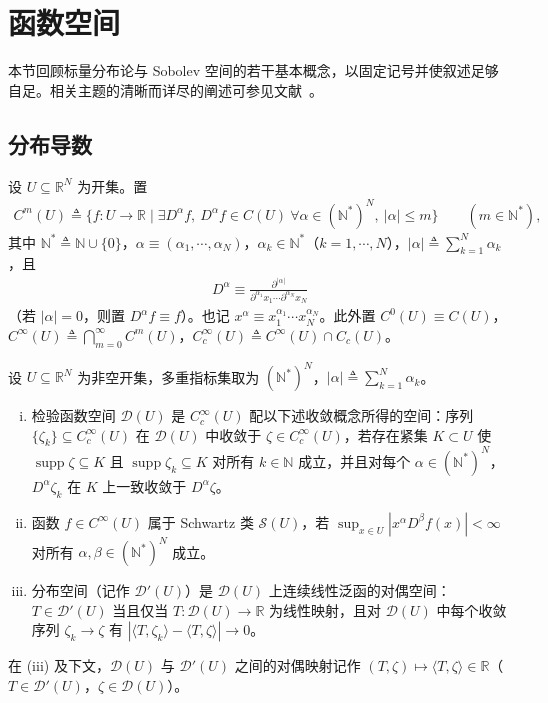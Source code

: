 \documentclass[../../main.tex]{subfiles}%
\begin{document}
\section{函数空间}\label{section:ch03-函数空间}

本节回顾标量分布论与 Sobolev 空间的若干基本概念，以固定记号并使叙述足够自足。相关主题的清晰而详尽的阐述可参见文献~\cite{ref01,ref64}。

\subsection{分布导数}\label{subsection:ch03-分布导数}

设 $U\subseteq\mathbb{R}^N$ 为开集。置
\begin{align*}
C^m(U)\triangleq \{f:U\to\mathbb{R}\mid \exists D^\alpha f,\ D^\alpha f\in C(U)\ \forall\alpha\in(\mathbb{N}^*)^N,\ |\alpha|\leqslant m\}\qquad(m\in\mathbb{N}^*),
\end{align*}
其中 $\mathbb{N}^*\triangleq\mathbb{N}\cup\{0\}$，$\alpha\equiv(\alpha_1,\cdots ,\alpha_N)$，$\alpha_k\in\mathbb{N}^*$（$k=1,\cdots ,N$），$|\alpha|\triangleq \sum_{k=1}^N\alpha_k$，且
\begin{align*}
D^\alpha\equiv\frac{\partial^{|\alpha|}}{\partial^{\alpha_1}x_1\cdots\partial^{\alpha_N}x_N}
\end{align*}
（若 $|\alpha|=0$，则置 $D^\alpha f\equiv f$）。也记 $x^\alpha\equiv x_1^{\alpha_1}\cdots x_N^{\alpha_N}$。此外置 $C^0(U)\equiv C(U)$，$C^\infty(U)\triangleq \bigcap_{m=0}^\infty C^m(U)$，$C^\infty_c(U)\triangleq C^\infty(U)\cap C_c(U)$。

\begin{definition}\label{definition:ch03-分布与检验函数}
设 $U\subseteq\mathbb{R}^N$ 为非空开集，多重指标集取为 $(\mathbb{N}^*)^N$，$|\alpha|\triangleq\sum_{k=1}^N\alpha_k$。
\begin{enumerate}[(i)]
\item\label{item:ch03-分布-i} 检验函数空间 $\mathcal{D}(U)$ 是 $C^\infty_c(U)$ 配以下述收敛概念所得的空间：序列 $\{\zeta_k\}\subseteq C^\infty_c(U)$ 在 $\mathcal{D}(U)$ 中收敛于 $\zeta\in C^\infty_c(U)$，若存在紧集 $K\subset U$ 使 $\operatorname{supp}\zeta\subseteq K$ 且 $\operatorname{supp}\zeta_k\subseteq K$ 对所有 $k\in\mathbb{N}$ 成立，并且对每个 $\alpha\in(\mathbb{N}^*)^N$，$D^\alpha\zeta_k$ 在 $K$ 上一致收敛于 $D^\alpha\zeta$。
\item\label{item:ch03-分布-ii} 函数 $f\in C^\infty(U)$ 属于 Schwartz 类 $\mathcal{S}(U)$，若 $\sup_{x\in U}|x^\alpha D^\beta f(x)|<\infty$ 对所有 $\alpha,\beta\in(\mathbb{N}^*)^N$ 成立。
\item\label{item:ch03-分布-iii} 分布空间（记作 $\mathcal{D}'(U)$）是 $\mathcal{D}(U)$ 上连续线性泛函的对偶空间：$T\in\mathcal{D}'(U)$ 当且仅当 $T:\mathcal{D}(U)\to\mathbb{R}$ 为线性映射，且对 $\mathcal{D}(U)$ 中每个收敛序列 $\zeta_k\to\zeta$ 有 $|\langle T,\zeta_k\rangle-\langle T,\zeta\rangle|\to0$。
\end{enumerate}
在 (iii) 及下文，$\mathcal{D}(U)$ 与 $\mathcal{D}'(U)$ 之间的对偶映射记作 $(T,\zeta)\mapsto\langle T,\zeta\rangle\in\mathbb{R}$（$T\in\mathcal{D}'(U)$，$\zeta\in\mathcal{D}(U)$）。
\end{definition}
\end{document}

